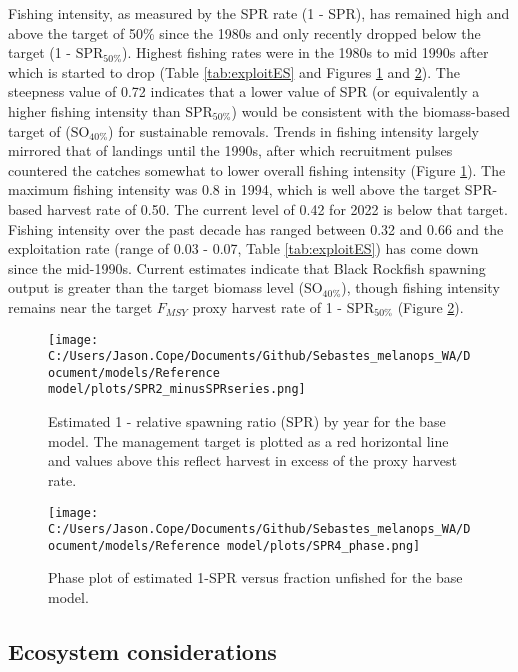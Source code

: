 \documentclass[11pt,
  english,
  letterpaper,
]{article}
\begin{document}
Fishing intensity, as measured by the SPR rate (1 - SPR), has remained high and above the target of 50\% since the 1980s and only recently dropped below the target (1 - \(\text{SPR}_{50\%}\)). Highest fishing rates were in the 1980s to mid 1990s after which is started to drop (Table \ref{tab:exploitES} and Figures \ref{fig:es-1-spr} and \ref{fig:es-phase}). The steepness value of 0.72 indicates that a lower value of SPR (or equivalently a higher fishing intensity than \(\text{SPR}_{50\%}\)) would be consistent with the biomass-based target of (\(\text{SO}_{40\%}\)) for sustainable removals. Trends in fishing intensity largely mirrored that of landings until the 1990s, after which recruitment pulses countered the catches somewhat to lower overall fishing intensity (Figure \ref{fig:es-1-spr}). The maximum fishing intensity was 0.8 in 1994, which is well above the target SPR-based harvest rate of 0.50. The current level of 0.42 for 2022 is below that target. Fishing intensity over the past decade has ranged between 0.32 and 0.66 and the exploitation rate (range of 0.03 - 0.07, Table \ref{tab:exploitES}) has come down since the mid-1990s. Current estimates indicate that Black Rockfish spawning output is greater than the target biomass level (\(\text{SO}_{40\%}\)), though fishing intensity remains near the target \(F_{MSY}\) proxy harvest rate of 1 - \(\text{SPR}_{50\%}\) (Figure \ref{fig:es-phase}).



\begin{figure}
\centering
\texttt{[image: C:/Users/Jason.Cope/Documents/Github/Sebastes\_melanops\_WA/Document/models/Reference model/plots/SPR2\_minusSPRseries.png]}
\caption{Estimated 1 - relative spawning ratio (SPR) by year for the base model. The management target is plotted as a red horizontal line and values above this reflect harvest in excess of the proxy harvest rate.\label{fig:es-1-spr}}
\end{figure}

\begin{figure}
\centering
\texttt{[image: C:/Users/Jason.Cope/Documents/Github/Sebastes\_melanops\_WA/Document/models/Reference model/plots/SPR4\_phase.png]}
\caption{Phase plot of estimated 1-SPR versus fraction unfished for the base model.\label{fig:es-phase}}
\end{figure}

\clearpage

\hypertarget{ecosystem-considerations}{%
\subsection*{Ecosystem considerations}\label{ecosystem-considerations}}
\end{document}
